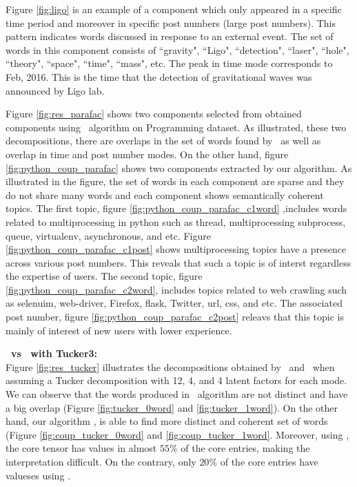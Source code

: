 Figure \ref{fig:ligo} is an example of a component which only appeared in a specific time period and
moreover in specific post numbers (large post numbers).  This pattern indicates words discussed in
response to an external event.  The set of words in this component consists of ``gravity", ``Ligo",
``detection", ``laser", ``hole", ``theory", ``space", ``time", ``mass", etc. The peak in time mode
corresponds to Feb, 2016. This is the time that the detection of gravitational waves was
announced by Ligo lab.

Figure \ref{fig:res_parafac} shows two components selected from obtained components  using \paraNS\
algorithm on Programming dataset. As illustrated, these two decompositions, there are overlaps in the set of words found by \paraNS\  as well as overlap in time and post number modes. On the other hand, figure \ref{fig:python_coup_parafac} shows two components extracted by our algorithm.  As illustrated in the figure, 
the set of words in each component are sparse and they do not share many words  and each component shows semantically coherent topics. The first topic, figure \ref{fig:python_coup_parafac_c1word} ,includes words related to multiprocessing in python such as thread, multiprocessing subprocess, queue, virtualenv, asynchronous, and etc.  Figure \ref{fig:python_coup_parafac_c1post} shows multiprocessing topics have a presence  across various post numbers. This reveals that such a topic is of interst regardless the expertise of users.  The second topic, figure  \ref{fig:python_coup_parafac_c2word},  includes topics related to web crawling such as selenuim, web-driver, Firefox, flask, Twitter, url, css, and etc. The associated post number, figure \ref{fig:python_coup_parafac_c2post} releavs that this topic is mainly of interest of new users with lower experience. 

\textbf{\tuckerNS\ vs \ourAlgo\ with Tucker3:}\\
Figure \ref{fig:res_tucker} illustrates the decompositions obtained by \tuckerNS\  and \ourAlgo\ when assuming a Tucker decomposition with 12, 4, and 4 latent factors for each mode.
 We can observe that the  words produced  in \tuckerNS\ algorithm are not distinct and have a big overlap (Figure \ref{fig:tucker_0word} and \ref{fig:tucker_1word}). 
On the other hand, our algorithm \ourAlgo, is 
able to find more distinct and coherent set of words
 (Figure \ref{fig:coup_tucker_0word} and \ref{fig:coup_tucker_1word}. 
Moreover, using \tuckerNS, the core tensor has values in almost $55\%$ 
of the core entries, making the interpretation difficult. 
On the contrary, only $20\%$ of the core entries have valueses using \ourAlgo. 

